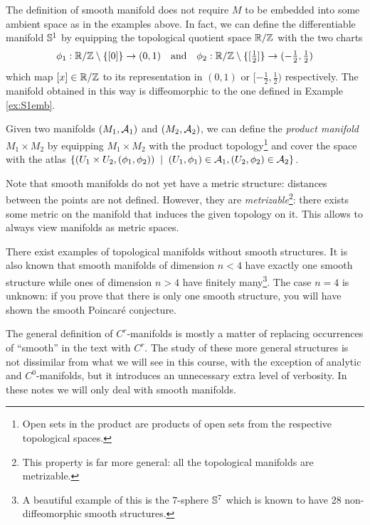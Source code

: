 \begin{ex}
  The definition of smooth manifold does not require $M$ to be embedded into some ambient space as in the examples above.
  In fact, we can define the differentiable manifold $\mathbb{S}^1$ by equipping the topological quotient space $\mathbb{R}/\mathbb{Z}$ with the two charts
  \begin{equation}\textstyle
    \phi_1 : \mathbb{R}/\mathbb{Z} \setminus\{[0]\} \to (0,1)
    \quad\mbox{and}\quad
    \phi_2 : \mathbb{R}/\mathbb{Z} \setminus\{[\frac12]\} \to (-\frac12,\frac12)
  \end{equation}
  which map $[x]\in\mathbb{R}/\mathbb{Z}$ to its representation in $(0,1)$ or $[-\frac12, \frac12)$ respectively.
  The manifold obtained in this way is diffeomorphic to the one defined in Example \ref{ex:S1emb}.
\end{ex}

\begin{ex}
Given two manifolds $(M_1, \mathcal{A}_1)$ and $(M_2, \mathcal{A}_2)$, we can define the \emph{product manifold} $M_1 \times M_2$ by equipping $M_1 \times M_2$ with the product topology\footnote{Open sets in the product are products of open sets from the respective topological spaces.} and cover the space with the atlas $\{ (U_1\times U_2, (\phi_1, \phi_2)) \;\mid\; (U_1, \phi_1)\in\mathcal{A}_1, (U_2, \phi_2)\in \mathcal{A}_2\}$.
\end{ex}

Note that smooth manifolds do not yet have a metric structure: distances between the points are not defined.
However, they are \emph{metrizable}\footnote{This property is far more general: all the topological manifolds are metrizable.}: there exists some metric on the manifold that induces the given topology on it.
This allows to always view manifolds as metric spaces.

\begin{rmk}
	There exist examples of topological manifolds without smooth structures.
	It is also known that smooth manifolds of dimension $n < 4$ have exactly one smooth structure while ones of dimension $n > 4$ have finitely many\footnote{A beautiful example of this is the $7$-sphere $\mathbb{S}^7$ which is known to have 28 non-diffeomorphic smooth structures.}.
	The case $n = 4$ is unknown: if you prove that there is only one smooth structure, you will have shown the smooth Poincar\'e conjecture.
\end{rmk}

\begin{tcolorbox}
  The general definition of $C^r$-manifolds is mostly a matter of replacing occurrences of ``smooth'' in the text with $C^r$.
  The study of these more general structures is not dissimilar from what we will see in this course, with the exception of analytic and $C^0$-manifolds, but it introduces an unnecessary extra level of verbosity.
  In these notes we will only deal with smooth manifolds.
\end{tcolorbox}

